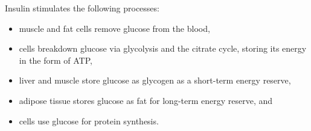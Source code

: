 






Insulin stimulates the following processes:

\begin{itemize}
\item muscle and fat cells remove glucose from the blood,
\item cells breakdown glucose via glycolysis and the citrate cycle, storing its energy in the form of ATP,
\item liver and muscle store glucose as glycogen as a short-term energy reserve,
\item adipose tissue stores glucose as fat for long-term energy reserve, and
\item cells use glucose for protein synthesis.
\end{itemize}



 



